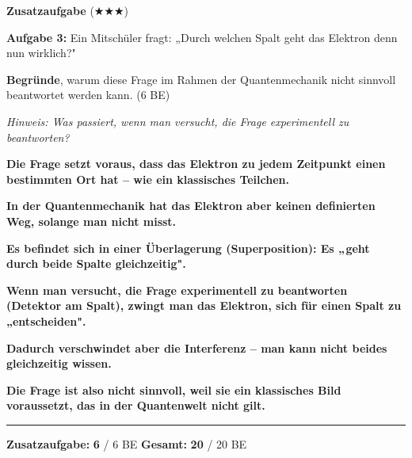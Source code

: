 \documentclass[11pt,a4paper]{article}
\newcommand{\lsg}[1]{\textcolor{loesung}{\textbf{#1}}}
\begin{document}
\vspace{0.5em}


\vspace{0.5em}


{\large\textbf{Zusatzaufgabe} ($\bigstar\bigstar\bigstar$)}

\vspace{0.3em}

\textbf{Aufgabe 3:} Ein Mitschüler fragt: „Durch welchen Spalt geht das Elektron denn nun wirklich?"

\textbf{Begründe}, warum diese Frage im Rahmen der Quantenmechanik nicht sinnvoll beantwortet werden kann. \hfill (6 BE)

\textit{Hinweis: Was passiert, wenn man versucht, die Frage experimentell zu beantworten?}

\lsg{Die Frage setzt voraus, dass das Elektron zu jedem Zeitpunkt einen bestimmten Ort hat – wie ein klassisches Teilchen.}

\lsg{In der Quantenmechanik hat das Elektron aber keinen definierten Weg, solange man nicht misst.}

\lsg{Es befindet sich in einer Überlagerung (Superposition): Es „geht durch beide Spalte gleichzeitig".}

\lsg{Wenn man versucht, die Frage experimentell zu beantworten (Detektor am Spalt), zwingt man das Elektron, sich für einen Spalt zu „entscheiden".}

\lsg{Dadurch verschwindet aber die Interferenz – man kann nicht beides gleichzeitig wissen.}

\lsg{Die Frage ist also nicht sinnvoll, weil sie ein klassisches Bild voraussetzt, das in der Quantenwelt nicht gilt.}

\begin{center}
\rule{10cm}{0.5pt}

\textbf{Zusatzaufgabe:} \lsg{6} / 6 BE \hspace{2cm} \textbf{Gesamt:} \lsg{20} / 20 BE
\end{center}
\end{document}
